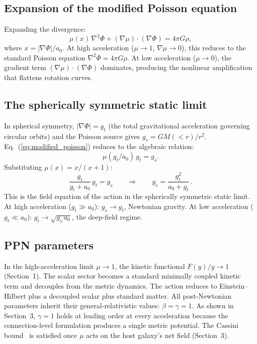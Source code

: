 \documentclass[11pt]{article}
\begin{document}
\subsection*{Expansion of the modified Poisson equation}

Expanding the divergence:
\begin{equation}
  \mu(x)\,\nabla^2\Phi
  + (\nabla\mu)\cdot(\nabla\Phi) = 4\pi G\rho,
  \label{eq:expanded}
\end{equation}
where $x = |\nabla\Phi|/a_0$.  At high acceleration
($\mu \to 1$, $\nabla\mu \to 0$), this reduces to the
standard Poisson equation $\nabla^2\Phi = 4\pi G\rho$.
At low acceleration ($\mu \to 0$), the gradient term
$(\nabla\mu)\cdot(\nabla\Phi)$ dominates, producing the
nonlinear amplification that flattens rotation curves.

\subsection*{The spherically symmetric static limit}

In spherical symmetry, $|\nabla\Phi| = g_t$ (the total
gravitational acceleration governing circular orbits) and
the Poisson source gives $g_s = GM({<}r)/r^2$.
Eq.~(\ref{eq:modified_poisson}) reduces to the algebraic
relation:
\begin{equation}
  \mu(g_t/a_0)\,g_t = g_s.
  \label{eq:algebraic}
\end{equation}
Substituting $\mu(x) = x/(x{+}1)$:
\begin{equation}
  \frac{g_t}{g_t + a_0}\,g_t = g_s
  \qquad\Longrightarrow\qquad
  \boxed{g_s = \frac{g_t^2}{a_0 + g_t}\,.}
  \label{eq:sst}
\end{equation}
This is the field equation of the action in the spherically
symmetric static limit.  At high acceleration
($g_t \gg a_0$): $g_s \to g_t$, Newtonian gravity.  At
low acceleration ($g_t \ll a_0$):
$g_t \to \sqrt{g_s\,a_0}$, the deep-field regime.

\subsection*{PPN parameters}

In the high-acceleration limit $\mu \to 1$, the kinetic
functional $F(y)/y \to 1$ (Section~1).  The scalar sector
becomes a standard minimally coupled kinetic term and
decouples from the metric dynamics.  The action reduces
to Einstein--Hilbert plus a decoupled scalar plus
standard matter.  All post-Newtonian parameters inherit
their general-relativistic values:
$\beta = \gamma = 1$.  As shown in Section~3, $\gamma = 1$
holds at leading order at every acceleration because the
connection-level formulation produces a single metric
potential.  The Cassini bound~\cite{Bertotti2003} is satisfied
once $\mu$ acts on the host galaxy's net field (Section~3).
\end{document}
